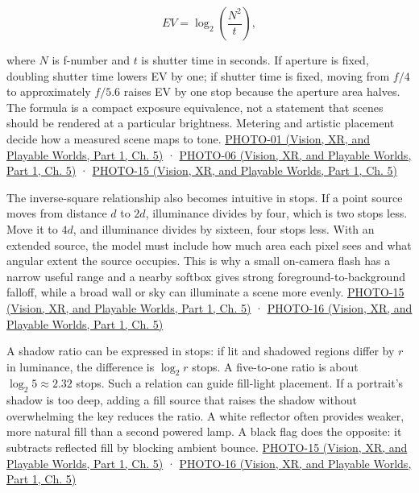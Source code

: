 \[
EV=\log_2\left(\frac{N^2}{t}\right),
\]

where \(N\) is f-number and \(t\) is shutter time in seconds. If aperture is fixed, doubling shutter time lowers EV by one; if shutter time is fixed, moving from \(f/4\) to approximately \(f/5.6\) raises EV by one stop because the aperture area halves. The formula is a compact exposure equivalence, not a statement that scenes should be rendered at a particular brightness. Metering and artistic placement decide how a measured scene maps to tone. \href{../07-Vision-XR-and-Playable-Worlds-P01/main.pdf\#nameddest=04-visual-computing-ii-ch036-photo-01---photography-session-01}{PHOTO-01 (Vision, XR, and Playable Worlds, Part 1, Ch. 5)} · \href{../07-Vision-XR-and-Playable-Worlds-P01/main.pdf\#nameddest=04-visual-computing-ii-ch036-photo-06---photography-session-06}{PHOTO-06 (Vision, XR, and Playable Worlds, Part 1, Ch. 5)} · \href{../07-Vision-XR-and-Playable-Worlds-P01/main.pdf\#nameddest=04-visual-computing-ii-ch036-photo-15---photography-session-15}{PHOTO-15 (Vision, XR, and Playable Worlds, Part 1, Ch. 5)}

The inverse-square relationship also becomes intuitive in stops. If a point source moves from distance \(d\) to \(2d\), illuminance divides by four, which is two stops less. Move it to \(4d\), and illuminance divides by sixteen, four stops less. With an extended source, the model must include how much area each pixel sees and what angular extent the source occupies. This is why a small on-camera flash has a narrow useful range and a nearby softbox gives strong foreground-to-background falloff, while a broad wall or sky can illuminate a scene more evenly. \href{../07-Vision-XR-and-Playable-Worlds-P01/main.pdf\#nameddest=04-visual-computing-ii-ch036-photo-15---photography-session-15}{PHOTO-15 (Vision, XR, and Playable Worlds, Part 1, Ch. 5)} · \href{../07-Vision-XR-and-Playable-Worlds-P01/main.pdf\#nameddest=04-visual-computing-ii-ch036-photo-16---photography-session-16}{PHOTO-16 (Vision, XR, and Playable Worlds, Part 1, Ch. 5)}

A shadow ratio can be expressed in stops: if lit and shadowed regions differ by \(r\) in luminance, the difference is \(\log_2 r\) stops. A five-to-one ratio is about \(\log_2 5\approx2.32\) stops. Such a relation can guide fill-light placement. If a portrait's shadow is too deep, adding a fill source that raises the shadow without overwhelming the key reduces the ratio. A white reflector often provides weaker, more natural fill than a second powered lamp. A black flag does the opposite: it subtracts reflected fill by blocking ambient bounce. \href{../07-Vision-XR-and-Playable-Worlds-P01/main.pdf\#nameddest=04-visual-computing-ii-ch036-photo-15---photography-session-15}{PHOTO-15 (Vision, XR, and Playable Worlds, Part 1, Ch. 5)} · \href{../07-Vision-XR-and-Playable-Worlds-P01/main.pdf\#nameddest=04-visual-computing-ii-ch036-photo-16---photography-session-16}{PHOTO-16 (Vision, XR, and Playable Worlds, Part 1, Ch. 5)}

